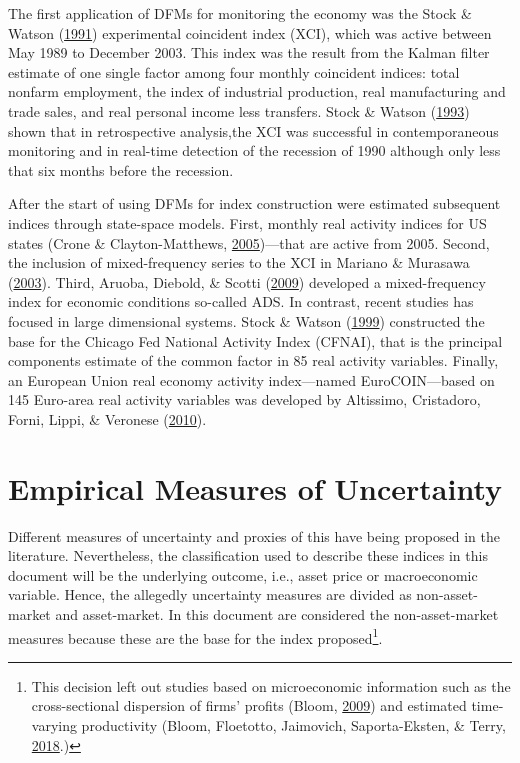 \documentclass[12pt,twoside]{reedthesis}
\begin{document}
The first application of DFMs for monitoring the economy was the Stock \& Watson (\protect\hyperlink{ref-stocwats:1991}{1991}) experimental coincident index (XCI), which was active between May 1989 to December 2003. This index was the result from the Kalman filter estimate of one single factor among four monthly coincident indices: total nonfarm employment, the index of industrial production, real manufacturing and trade sales, and real personal income less transfers. Stock \& Watson (\protect\hyperlink{ref-stocwats:1993}{1993}) shown that in retrospective analysis,the XCI was successful in contemporaneous monitoring and in real-time detection of the recession of 1990 although only less that six months before the recession.

After the start of using DFMs for index construction were estimated subsequent indices through state-space models. First, monthly real activity indices for US states (Crone \& Clayton-Matthews, \protect\hyperlink{ref-cronclay:2005}{2005})---that are active from 2005. Second, the inclusion of mixed-frequency series to the XCI in Mariano \& Murasawa (\protect\hyperlink{ref-marimura:2003}{2003}). Third, Aruoba, Diebold, \& Scotti (\protect\hyperlink{ref-aruodiebscot:2009}{2009}) developed a mixed-frequency index for economic conditions so-called ADS. In contrast, recent studies has focused in large dimensional systems. Stock \& Watson (\protect\hyperlink{ref-stocwats:1999}{1999}) constructed the base for the Chicago Fed National Activity Index (CFNAI), that is the principal components estimate of the common factor in 85 real activity variables. Finally, an European Union real economy activity index---named EuroCOIN---based on 145 Euro-area real activity variables was developed by Altissimo, Cristadoro, Forni, Lippi, \& Veronese (\protect\hyperlink{ref-alticrisfornlippvero:2010}{2010}).

\hypertarget{empirical-measures-of-uncertainty}{%
\section{Empirical Measures of Uncertainty}\label{empirical-measures-of-uncertainty}}

Different measures of uncertainty and proxies of this have being proposed in the literature. Nevertheless, the classification used to describe these indices in this document will be the underlying outcome, i.e., asset price or macroeconomic variable. Hence, the allegedly uncertainty measures are divided as non-asset-market and asset-market. In this document are considered the non-asset-market measures because these are the base for the index proposed\footnote{This decision left out studies based on microeconomic information such as the cross-sectional dispersion of ﬁrms' proﬁts (Bloom, \protect\hyperlink{ref-bloom:2009}{2009}) and estimated time-varying productivity (Bloom, Floetotto, Jaimovich, Saporta-Eksten, \& Terry, \protect\hyperlink{ref-bloofloejaimsapoterr:2018}{2018}.)}.
\end{document}
